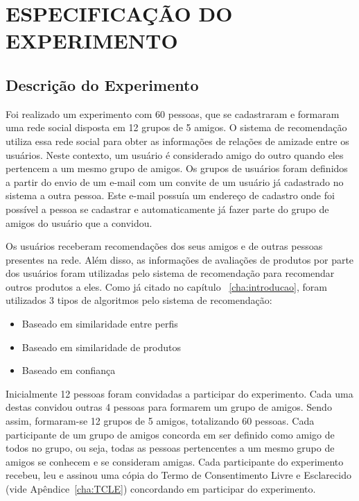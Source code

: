 \chapter{ESPECIFICAÇÃO DO EXPERIMENTO} %
\label{cha:especificacao_do_experimento} %

\section{Descrição do Experimento}
\label{cha:descricao_do_experimento}

Foi realizado um experimento com 60 pessoas, que se cadastraram e formaram uma rede social disposta em 12 grupos de 5 amigos. O sistema de recomendação utiliza essa rede social para obter as informações de relações de amizade entre os usuários. Neste contexto, um usuário é considerado amigo do outro quando eles pertencem a um mesmo grupo de amigos. Os grupos de usuários foram definidos a partir do envio de um e-mail com um convite de um usuário já cadastrado no sistema a outra pessoa. Este e-mail possuía um endereço de cadastro onde foi possível a pessoa se cadastrar e automaticamente já fazer parte do grupo de amigos do usuário que a convidou.

Os usuários receberam recomendações dos seus amigos e de outras pessoas presentes na rede. Além disso, as informações de avaliações de produtos por parte dos usuários foram utilizadas pelo sistema de recomendação para recomendar outros produtos a eles. Como já citado no capítulo ~\ref{cha:introducao}, foram utilizados 3 tipos de algoritmos pelo sistema de recomendação:

\begin{itemize}
  \item Baseado em similaridade entre perfis
  \item Baseado em similaridade de produtos
  \item Baseado em confiança
\end{itemize}

Inicialmente 12 pessoas foram convidadas a participar do experimento. Cada uma destas convidou outras 4 pessoas para formarem um grupo de amigos. Sendo assim, formaram-se 12 grupos de 5 amigos, totalizando 60 pessoas. Cada participante de um grupo de amigos concorda em ser definido como amigo de todos no grupo, ou seja, todas as pessoas pertencentes a um mesmo grupo de amigos se conhecem e se consideram amigas. Cada participante do experimento recebeu, leu e assinou uma cópia do Termo de Consentimento Livre e Esclarecido (vide Apêndice~\ref{cha:TCLE}) concordando em participar do experimento.

